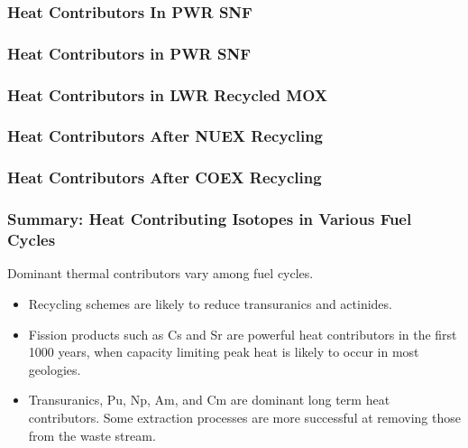 
\begin{frame}[ctb!]
  \frametitle{Heat Contributors In PWR SNF}
\footnotesize{
  
}
\end{frame}

\begin{frame}[ctb!]
  \frametitle{Heat Contributors in PWR SNF}
\footnotesize{
  
}
\end{frame}
\begin{frame}[ctb!]
  \frametitle{Heat Contributors in LWR Recycled MOX}
\footnotesize{
  
}
\end{frame}
\begin{frame}[ctb!]
  \frametitle{Heat Contributors After NUEX Recycling}
\footnotesize{
  
}
\end{frame}

\begin{frame}[ctb!]
  \frametitle{Heat Contributors After COEX Recycling}
\footnotesize{
  
}
\end{frame}
\begin{frame}[ctb!]
  \frametitle{Summary: Heat Contributing Isotopes in Various Fuel Cycles}
\footnotesize{
Dominant thermal contributors vary among fuel cycles. 
\begin{itemize}
   \item Recycling schemes are likely to reduce transuranics and actinides.
   \item Fission products such as Cs and Sr are powerful heat contributors in the first 1000 years, when capacity limiting peak heat is likely to occur in most geologies.
   \item Transuranics, Pu, Np, Am, and Cm are dominant long term heat contributors. Some extraction processes are more successful at removing those from the waste stream. 
\end{itemize}
}
\end{frame}

